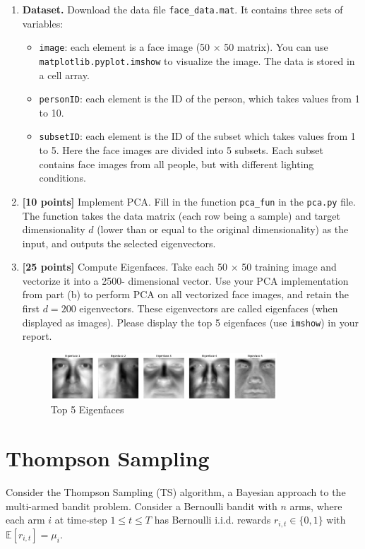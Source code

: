 \documentclass[a3paper,12pt]{extarticle} %
\begin{document}
\begin{enumerate}
    \item \textbf{Dataset.} Download the data file \texttt{face\_data.mat}. It contains three sets of variables:
    \begin{itemize}
        \item \texttt{image}: each element is a face image (50 × 50 matrix). You can use \texttt{matplotlib.pyplot.imshow}
        to visualize the image. The data is stored in a cell array.
        \item \texttt{personID}: each element is the ID of the person, which takes values from 1 to 10.
        \item \texttt{subsetID}: each element is the ID of the subset which takes values from 1 to 5. Here the face
        images are divided into 5 subsets. Each subset contains face images from all people, but with
        different lighting conditions.
    \end{itemize}
    
    \item \textbf{[10 points]} Implement PCA. Fill in the function \texttt{pca\_fun} in the \texttt{pca.py} file. The function takes the
    data matrix (each row being a sample) and target dimensionality $d$ (lower than or equal to the original
    dimensionality) as the input, and outputs the selected eigenvectors.
    
    \item \textbf{[25 points]} Compute Eigenfaces. Take each 50 × 50 training image and vectorize it into a 2500-
    dimensional vector. Use your PCA implementation from part (b) to perform PCA on all vectorized
    face images, and retain the first $d = 200$ eigenvectors. These eigenvectors are called eigenfaces (when
    displayed as images). Please display the top 5 eigenfaces (use \texttt{imshow}) in your report.
    \begin{figure}[H]
    \centering
    \includegraphics[width=0.8\textwidth]{top_5_eigenfaces.png}
    \caption{Top 5 Eigenfaces}
    \label{fig:eigenfaces}
    \end{figure}
\end{enumerate}

\newpage 

\section{Thompson Sampling}
Consider the Thompson Sampling (TS) algorithm, a Bayesian approach to the multi-armed bandit problem. Consider a Bernoulli bandit with $n$ arms, where each arm $i$ at time-step $1 \leq t \leq T$ has Bernoulli i.i.d. rewards $r_{i,t} \in \{0, 1\}$ with $\mathbb{E}[r_{i,t}] = \mu_i$. 
\end{document}
